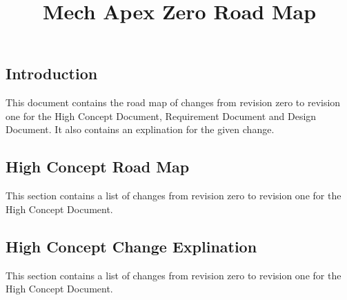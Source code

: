 \documentclass[]{article}
\title{Mech Apex Zero Road Map}
\author{}
\begin{document}
\maketitle
\subsection*{Introduction}
This document contains the road map of changes from revision zero to revision one for the High Concept Document, Requirement Document and Design Document. It also  contains an explination for the given change.
\subsection*{High Concept Road Map}
This section contains a list of changes from revision zero to revision one for the High Concept Document.

\subsection*{High Concept Change Explination}
This section contains a list of changes from revision zero to revision one for the High Concept Document.
\end{document}

